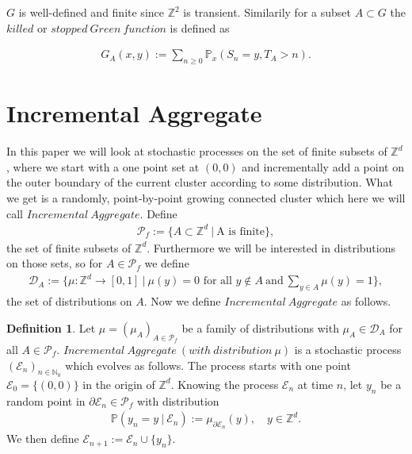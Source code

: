 \documentclass[12pt,a4paper]{scrartcl}
\numberwithin{equation}{subsection}
\newcommand{\Z}{\mathbb{Z}} %
\newcommand{\1}{\mathbbm{1}}
\numberwithin{equation}{section}
\theoremstyle{definition}
\newtheorem{definition}{Definition}[subsection]
\begin{document}
$G$ is well-defined and finite since $\Z^2$ is transient. Similarily for a subset $A\subset G$ the $killed$ or $\mathit{stopped\ Green\ function}$ is defined as

\begin{align*}
	G_A(x,y) := \sum_{n\geq 0} \mathbb{P}_x(S_n=y, T_A > n).
\end{align*} 



\newpage
\section{Incremental Aggregate}
In this paper we will look at stochastic processes on the set of finite subsets of $\mathbb{Z}^d$, where we start with a one point set at $(0,0)$ and incrementally add a point on the outer boundary of the current cluster according to some distribution. What we get is a randomly, point-by-point growing connected cluster which here we will call $\mathit{Incremental\ Aggregate}$. Define 
\begin{align}
	\mathcal{P}_f := \{A\subset \mathbb{Z}^d\ |\ \text{A is finite}\}, 
\end{align}
the set of finite subsets of $\mathbb{Z}^d$. Furthermore we will be interested in distributions on those sets, so for $A\in \mathcal{P}_f$ we define 
\begin{align}
	\mathcal{D}_A:= \{\mu: \mathbb{Z}^d\to [0,1]\ |\ \mu(y) = 0 \text{ for all } y\notin A\ \text{and}\ \sum_{y\in A} \mu(y) = 1 \}, 
\end{align}
the set of distributions on $A$. Now we define $\mathit{Incremental\ Aggregate}$ as follows.  

\begin{definition}
	Let $\mu=(\mu_A)_{A\in \mathcal{P}_f}$ be a family of distributions with $\mu_A\in \mathcal{D}_A$ for all $A\in \mathcal{P}_f$. $\mathit{Incremental\ Aggregate\ (with\ distribution\ \mu)}$ is a stochastic process $(\mathcal{E}_n)_{n\in{\mathbb{N}_0}}$ which evolves as follows. The process starts with one point $\mathcal{E}_0 = \{(0,0)\}$ in the origin of $\mathbb{Z}^d$. Knowing the process $\mathcal{E}_n$ at time $n$, let $y_n$ be a random point in $\partial \mathcal{E}_n\in \mathcal{P}_f$ with distribution
	\begin{align}
		\mathbb{P}(y_n = y\ |\ \mathcal{E}_n) := \mu_{\partial \mathcal{E}_n}(y),\quad y\in \mathbb{Z}^d.
	\end{align}
	We then define $\mathcal{E}_{n+1} := \mathcal{E}_n \cup \{y_n\}$.
\end{definition} 
\end{document}
